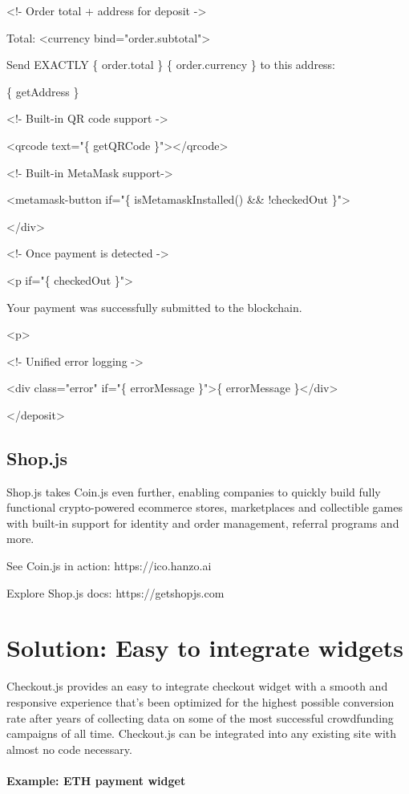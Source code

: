 \documentclass[11pt]{article}
\begin{document}
<!- Order total + address for deposit ->


Total: <currency bind="order.subtotal">


Send EXACTLY \{ order.total \} \{ order.currency \} to this address:


\{ getAddress \}


<!- Built-in QR code support ->


<qrcode text="\{ getQRCode \}"></qrcode>


<!- Built-in MetaMask support->


<metamask-button if="\{ isMetamaskInstalled() \&\& !checkedOut \}">


</div>


<!- Once payment is detected ->


<p if="\{ checkedOut \}">


Your payment was successfully submitted to the blockchain.


<p>


<!- Unified error logging ->


<div class="error" if="\{ errorMessage \}">\{ errorMessage \}</div>


</deposit>


\subsection{Shop.js}

Shop.js takes Coin.js even further, enabling companies to quickly build fully functional crypto-powered ecommerce stores, marketplaces and collectible games with built-in support for identity and order management, referral programs and more.


See Coin.js in action: https://ico.hanzo.ai


Explore Shop.js docs: https://getshopjs.com


\section{Solution: Easy to integrate widgets}

Checkout.js provides an easy to integrate checkout widget with a smooth and responsive experience that's been optimized for the highest possible conversion rate after years of collecting data on some of the most successful crowdfunding campaigns of all time. Checkout.js can be integrated into any existing site with almost no code necessary.


\paragraph{Example: ETH payment widget}
\end{document}
